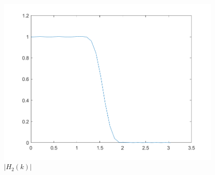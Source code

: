\documentclass{../source/zjureport}
\begin{document}
\begin{figure}[H]
\begin{minipage}[H]{0.32\textwidth}
                    \centering
                    \includegraphics[width=\textwidth]{figure/H_2.png}
                    \caption{$|H_2(k)|$}
                \end{minipage}
            \end{figure}
\end{document}
